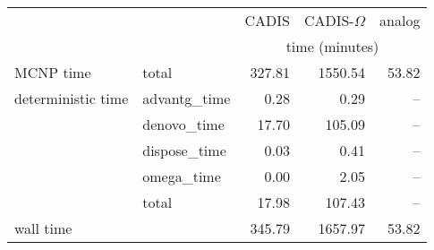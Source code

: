\begin{tabular}{llrrr}
\toprule
          &             &          CADIS & CADIS-$\Omega$ &         analog \\
        &              & \multicolumn{3}{c}{time (minutes)} \\
\midrule
MCNP time & total &         327.81 &        1550.54 &          53.82 \\
deterministic time & advantg\_time &           0.28 &           0.29 &            -- \\
          & denovo\_time &          17.70 &         105.09 &            -- \\
          & dispose\_time &           0.03 &           0.41 &            -- \\
          & omega\_time &           0.00 &           2.05 &            -- \\
          & total &          17.98 &         107.43 &            -- \\
wall time &              &         345.79 &        1657.97 &          53.82 \\
\bottomrule
\end{tabular}

